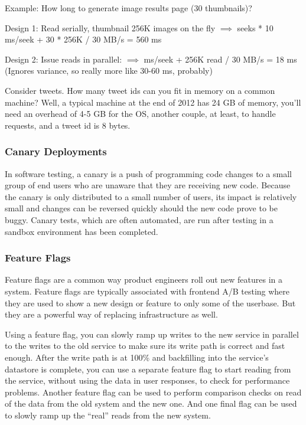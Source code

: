 \documentclass{article}
\begin{document}
    Example: How long to generate image results page (30 thumbnails)?
    
    Design 1: Read serially, thumbnail 256K images on the fly $\implies$   seeks * 10 ms/seek + 30 * 256K / 30 MB/s = 560 ms
    
    Design 2: Issue reads in parallel: $\implies$  ms/seek + 256K read / 30 MB/s = 18 ms (Ignores variance, so really more like 30-60 ms, probably)
    
    Consider tweets. How many tweet ids can you fit in memory on a common machine? Well, a typical machine at the end of 2012 has 24 GB of memory, you’ll need an overhead of 4-5 GB for the OS, another couple, at least, to handle requests, and a tweet id is 8 bytes.
    
    \subsubsection{Canary Deployments}
    In software testing, a canary is a push of programming code changes to a small group of end users who are unaware that they are receiving new code. Because the canary is only distributed to a small number of users, its impact is relatively small and changes can be reversed quickly should the new code prove to be buggy. Canary tests, which are often automated, are run after testing in a sandbox environment has been completed.
    
    \subsubsection{Feature Flags}
    Feature flags are a common way product engineers roll out new features in a system. Feature flags are typically associated with frontend A/B testing where they are used to show a new design or feature to only some of the userbase. But they are a powerful way of replacing infrastructure as well.
    
    Using a feature flag, you can slowly ramp up writes to the new service in parallel to the writes to the old service to make sure its write path is correct and fast enough. After the write path is at 100\% and backfilling into the service’s datastore is complete, you can use a separate feature flag to start reading from the service, without using the data in user responses, to check for performance problems. Another feature flag can be used to perform comparison checks on read of the data from the old system and the new one. And one final flag can be used to slowly ramp up the ``real” reads from the new system.
\end{document}
